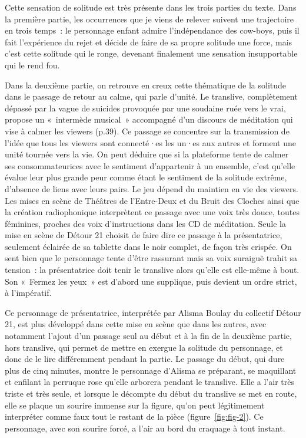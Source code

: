 \documentclass[
]{article}
\begin{document}
Cette sensation de solitude est très présente dans les trois parties du texte. Dans la première partie, les occurrences que je viens de relever suivent une trajectoire en trois temps~: le personnage enfant admire l'indépendance des cow-boys, puis il fait l'expérience du rejet et décide de faire de sa propre solitude une force, mais c'est cette solitude qui le ronge, devenant finalement une sensation insupportable qui le rend fou.

Dans la deuxième partie, on retrouve en creux cette thématique de la solitude dans le passage de retour au calme, qui parle d'unité. Le translive, complètement dépassé par la vague de suicides provoquée par une soudaine ruée vers le vrai, propose un «~intermède musical~» accompagné d'un discours de méditation qui vise à calmer les viewers (p.39). Ce passage se concentre sur la transmission de l'idée que tous les viewers sont connecté·es les un·es aux autres et forment une unité tournée vers la vie. On peut déduire que si la plateforme tente de calmer ses consommateurices avec le sentiment d'appartenir à un ensemble, c'est qu'elle évalue leur plus grande peur comme étant le sentiment de la solitude extrême, d'absence de liens avec leurs pairs. Le jeu dépend du maintien en vie des viewers. Les mises en scène de Théâtres de l'Entre-Deux et du Bruit des Cloches ainsi que la création radiophonique interprètent ce passage avec une voix très douce, toutes féminines, proches des voix d'instructions dans les CD de méditation. Seule la mise en scène de Détour 21 choisit de faire dire ce passage à la présentatrice, seulement éclairée de sa tablette dans le noir complet, de façon très crispée. On sent bien que le personnage tente d'être rassurant mais sa voix suraiguë trahit sa tension~: la présentatrice doit tenir le translive alors qu'elle est elle-même à bout. Son «~Fermez les yeux~» est d'abord une supplique, puis devient un ordre strict, à l'impératif.

Ce personnage de présentatrice, interprétée par Alisma Boulay du collectif Détour 21, est plus développé dans cette mise en scène que dans les autres, avec notamment l'ajout d'un passage seul au début et à la fin de la deuxième partie, hors translive, qui permet de mettre en exergue la solitude du personnage, et donc de le lire différemment pendant la partie. Le passage du début, qui dure plus de cinq minutes, montre le personnage d'Alisma se préparant, se maquillant et enfilant la perruque rose qu'elle arborera pendant le translive. Elle a l'air très triste et très seule, et lorsque le décompte du début du translive se met en route, elle se plaque un sourire immense sur la figure, qu'on peut légitimement interpréter comme faux tout le restant de la pièce (figure~\ref{fig:fig-2}). Ce personnage, avec son sourire forcé, a l'air au bord du craquage à tout instant.
\end{document}
